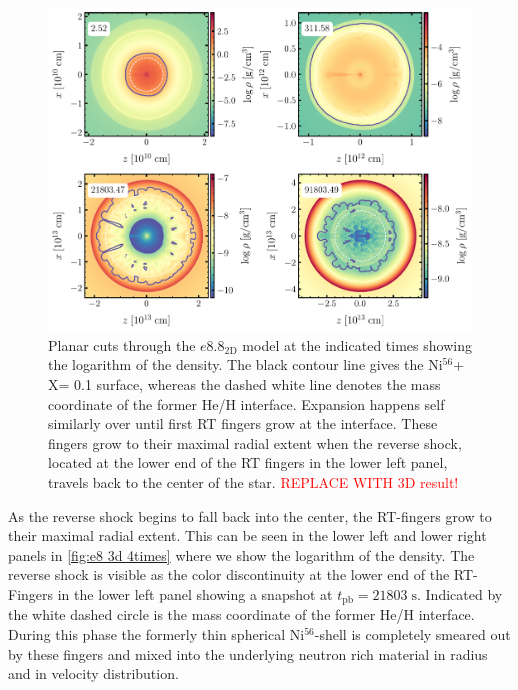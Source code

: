 \documentclass[fleqn,usenatbib]{mnras}
\newcommand{\nickel}{$\mathrm{Ni^{56}}$\xspace}
\newcommand{\tracer}{$\mathrm{X}$\xspace}
\begin{document}
\begin{figure}
 \centering
 \includegraphics[width=\textwidth]{pic/rho_cuts_e10_2d_4times.pdf} 
 \caption{Planar cuts through the $e8.8_{\mathrm{2D}}$ model at the indicated times showing the logarithm of the density. The black contour line gives the \nickel+ \tracer = 0.1 surface, whereas the dashed white line denotes the mass coordinate of the former He/H interface. Expansion happens self similarly over until first RT fingers grow at the interface. These fingers grow to their maximal radial extent when the reverse shock, located at the lower end of the RT fingers in the lower left panel, travels back to the center of the star. \textcolor{red}{REPLACE WITH 3D result!}}
 \label{fig:e8 3d 4times}
\end{figure}

As the reverse shock begins to fall back into the center, the RT-fingers grow to their maximal radial extent. This can be seen in the lower left and lower right panels in \autoref{fig:e8 3d 4times} where we show the logarithm of the density. The reverse shock is visible as the color discontinuity at the lower end of the RT-Fingers in the lower left panel showing a snapshot at $t_{\mathrm{pb}}=21803\;\mathrm{s}$. Indicated by the white dashed circle is the mass coordinate of the former He/H interface.
During this phase the formerly thin spherical \nickel-shell is completely smeared out by these fingers and mixed into the underlying neutron rich material in radius and in velocity distribution. 
\end{document}
